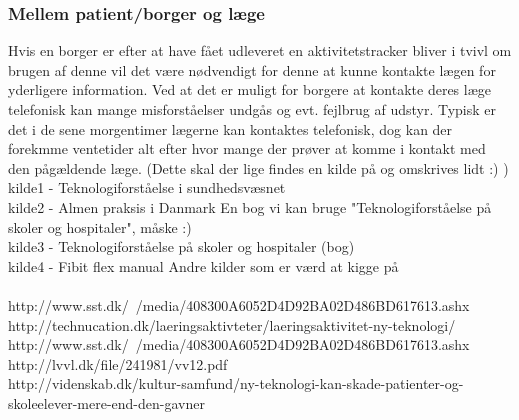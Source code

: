 \subsubsection{Mellem patient/borger og læge}
Hvis en borger er efter at have fået udleveret en aktivitetstracker bliver i tvivl om brugen af denne vil det være nødvendigt for denne at kunne kontakte lægen for yderligere information. Ved at det er muligt for borgere at kontakte deres læge telefonisk kan mange misforståelser undgås og evt. fejlbrug af udstyr. Typisk er det i de sene morgentimer lægerne kan kontaktes telefonisk, dog kan der forekmme ventetider alt efter hvor mange der prøver at komme i kontakt med den pågældende læge.  (Dette skal der lige findes en kilde på og omskrives lidt :) ) \\

kilde1 - Teknologiforståelse i sundhedsvæsnet \\
kilde2 - Almen praksis i Danmark
En bog vi kan bruge "Teknologiforståelse på skoler og hospitaler", måske :) \\
kilde3 - Teknologiforståelse på skoler og hospitaler (bog)\\
kilde4 - Fibit flex manual
Andre kilder som er værd at kigge på \\\\

http://www.sst.dk/~/media/408300A6052D4D92BA02D486BD617613.ashx \\
http://technucation.dk/laeringsaktivteter/laeringsaktivitet-ny-teknologi/ \\
http://www.sst.dk/~/media/408300A6052D4D92BA02D486BD617613.ashx \\
http://lvvl.dk/file/241981/vv12.pdf \\

http://videnskab.dk/kultur-samfund/ny-teknologi-kan-skade-patienter-og-skoleelever-mere-end-den-gavner
